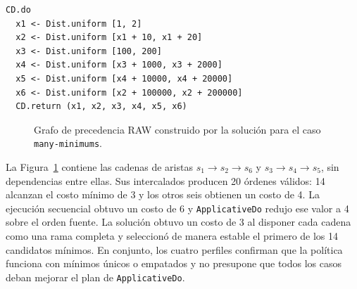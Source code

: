 \newpage

\begin{lstlisting}[style=haskell,caption={Programa probabilístico asociado al caso \texttt{many-minimums}.},label={lst:resultados-many-minimums}]
CD.do
  x1 <- Dist.uniform [1, 2]
  x2 <- Dist.uniform [x1 + 10, x1 + 20]
  x3 <- Dist.uniform [100, 200]
  x4 <- Dist.uniform [x3 + 1000, x3 + 2000]
  x5 <- Dist.uniform [x4 + 10000, x4 + 20000]
  x6 <- Dist.uniform [x2 + 100000, x2 + 200000]
  CD.return (x1, x2, x3, x4, x5, x6)
\end{lstlisting}

\begin{figure}[ht]
\centering
\begingroup
\setgraphnodesize{1.35cm}{0.9cm}{8pt}
\begin{PrecedenceGraph}[node distance=0.35cm and 0.28cm]
\end{PrecedenceGraph}
\endgroup
\caption[Grafo RAW del caso \texttt{many-minimums}.]{Grafo de precedencia RAW construido por la solución para el caso \texttt{many-minimums}.}
\label{fig:resultados-grafo-many-minimums}
\end{figure}

La Figura~\ref{fig:resultados-grafo-many-minimums} contiene las cadenas de aristas $s_1\to s_2\to s_6$ y $s_3\to s_4\to s_5$, sin dependencias entre ellas. Sus intercalados producen 20 órdenes válidos: 14 alcanzan el costo mínimo de 3 y los otros seis obtienen un costo de 4. La ejecución secuencial obtuvo un costo de 6 y \texttt{ApplicativeDo} redujo ese valor a 4 sobre el orden fuente. La solución obtuvo un costo de 3 al disponer cada cadena como una rama completa y seleccionó de manera estable el primero de los 14 candidatos mínimos. En conjunto, los cuatro perfiles confirman que la política funciona con mínimos únicos o empatados y no presupone que todos los casos deban mejorar el plan de \texttt{ApplicativeDo}.
